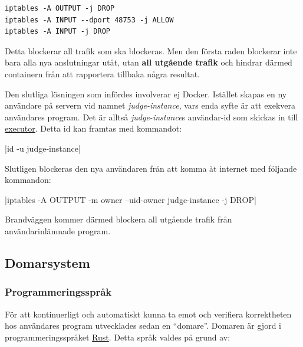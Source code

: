 \documentclass{article}
\begin{document}
\begin{verbatim}
iptables -A OUTPUT -j DROP
iptables -A INPUT --dport 48753 -j ALLOW
iptables -A INPUT -j DROP
\end{verbatim}

Detta blockerar all trafik som ska blockeras. Men den första raden blockerar
inte bara alla nya anslutningar utåt, utan \textbf{all utgående trafik} och
hindrar därmed containern från att rapportera tillbaka några resultat.

Den slutliga lösningen som infördes involverar ej Docker. Istället skapas
en ny användare på servern vid namnet \textit{judge-instance}, vars enda
syfte är att exekvera användares program. Det är alltså \textit{judge-instance}s
användar-id som skickas in till \hyperlink{executor}{executor}.
Detta id kan framtas med kommandot:

|id -u judge-instance|

Slutligen blockeras den nya användaren från att komma åt internet med följande
kommandon:

|iptables -A OUTPUT -m owner --uid-owner judge-instance -j DROP|

Brandväggen kommer därmed blockera all utgående trafik från användarinlämnade
program.

\subsection{Domarsystem}

\subsubsection{Programmeringsspråk}

För att kontinuerligt och automatiskt kunna ta emot och verifiera korrektheten
hos användares program utvecklades sedan en ``domare''. Domaren är gjord i
programmeringsspråket \href{https://rust-lang.org}{Rust}. Detta språk valdes på
grund av:
\end{document}
